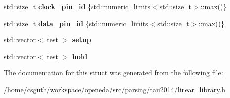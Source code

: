 \begin{DoxyCompactItemize}
\item 
\hypertarget{structophidian_1_1parsing_1_1tau2014_1_1linear__library_1_1cell_ae06430d92105dbdfc2a89c5ba8317445}{std\-::size\-\_\-t {\bfseries clock\-\_\-pin\-\_\-id} \{std\-::numeric\-\_\-limits$<$std\-::size\-\_\-t$>$\-::max()\}}\label{structophidian_1_1parsing_1_1tau2014_1_1linear__library_1_1cell_ae06430d92105dbdfc2a89c5ba8317445}

\item 
\hypertarget{structophidian_1_1parsing_1_1tau2014_1_1linear__library_1_1cell_aa0ebe8b34eb6c648c33672d75b9d5d27}{std\-::size\-\_\-t {\bfseries data\-\_\-pin\-\_\-id} \{std\-::numeric\-\_\-limits$<$std\-::size\-\_\-t$>$\-::max()\}}\label{structophidian_1_1parsing_1_1tau2014_1_1linear__library_1_1cell_aa0ebe8b34eb6c648c33672d75b9d5d27}

\item 
\hypertarget{structophidian_1_1parsing_1_1tau2014_1_1linear__library_1_1cell_a516c552dbdbdc9bc1331bc8467026ac5}{std\-::vector$<$ \hyperlink{structophidian_1_1parsing_1_1tau2014_1_1linear__library_1_1test}{test} $>$ {\bfseries setup}}\label{structophidian_1_1parsing_1_1tau2014_1_1linear__library_1_1cell_a516c552dbdbdc9bc1331bc8467026ac5}

\item 
\hypertarget{structophidian_1_1parsing_1_1tau2014_1_1linear__library_1_1cell_a23658d4ae794fabad04dc0d5789b176a}{std\-::vector$<$ \hyperlink{structophidian_1_1parsing_1_1tau2014_1_1linear__library_1_1test}{test} $>$ {\bfseries hold}}\label{structophidian_1_1parsing_1_1tau2014_1_1linear__library_1_1cell_a23658d4ae794fabad04dc0d5789b176a}

\end{DoxyCompactItemize}


The documentation for this struct was generated from the following file\-:\begin{DoxyCompactItemize}
\item 
/home/csguth/workspace/openeda/src/parsing/tau2014/linear\-\_\-library.\-h\end{DoxyCompactItemize}
